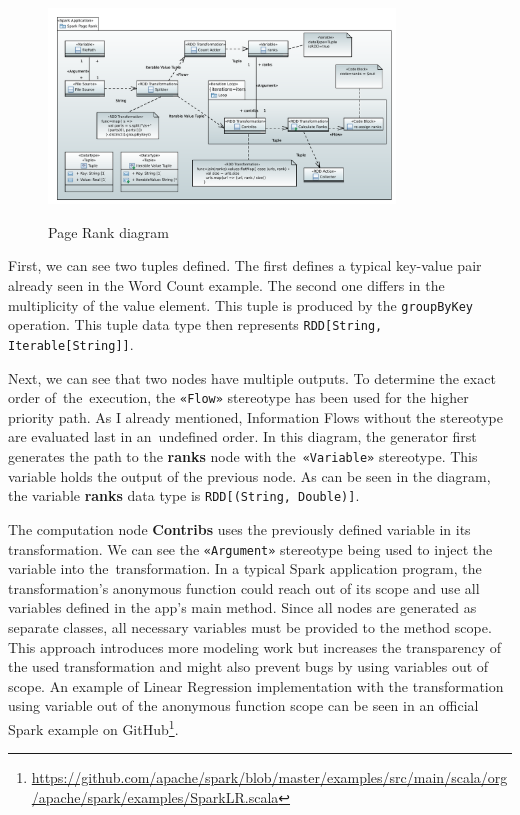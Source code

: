 \begin{figure}[H]
\centering
\includegraphics[angle=90,width=0.82\textwidth]{obrazky-figures/page-rank-diagram.pdf}
\label{fig:pagerank}
\caption{Page Rank diagram}
\end{figure}

First, we can see two tuples defined. The first defines a typical key-value pair already seen in the Word Count example. The second one differs in the multiplicity of the value element. This tuple is produced by the \texttt{groupByKey} operation. This tuple data type then represents \texttt{RDD[String, Iterable[String]]}.

Next, we can see that two nodes have multiple outputs. To determine the exact order of~the~execution, the \texttt{«Flow»} stereotype has been used for the higher priority path. As I already mentioned, Information Flows without the stereotype are evaluated last in an~undefined order. In this diagram, the generator first generates the path to the \textbf{ranks} node with the~\texttt{«Variable»} stereotype. This variable holds the output of the previous node. As can be seen in the diagram, the variable \textbf{ranks} data type is \texttt{RDD[(String, Double)]}. 

The computation node \textbf{Contribs} uses the previously defined variable in its
transformation. We can see the \texttt{«Argument»} stereotype being used to inject the variable into the~transformation. In a typical Spark application program, the transformation's anonymous function could reach out of its scope and use all variables defined in the app's main method. Since all nodes are generated as separate classes, all necessary variables must be provided to the method scope. This approach introduces more modeling work but increases the transparency of the used transformation and might also prevent bugs by using variables out of scope. An example of Linear Regression implementation with the transformation using variable out of the anonymous function scope can be seen in an official Spark example on GitHub\footnote{\url{https://github.com/apache/spark/blob/master/examples/src/main/scala/org/apache/spark/examples/SparkLR.scala}}. 

